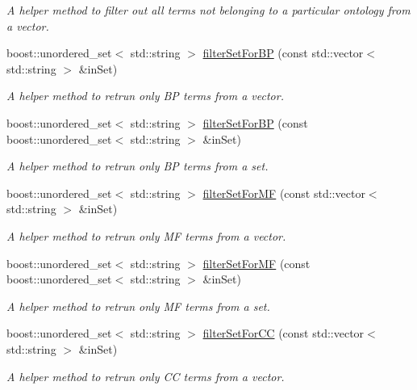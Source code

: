 \begin{DoxyCompactItemize}
\begin{DoxyCompactList}\small\item\em A helper method to filter out all terms not belonging to a particular ontology from a vector. \end{DoxyCompactList}\item 
boost\+::unordered\+\_\+set$<$ std\+::string $>$ \hyperlink{classGoGraph_a42f95a4728eac397fce20d2dcfc8a442}{filter\+Set\+For\+BP} (const std\+::vector$<$ std\+::string $>$ \&in\+Set)
\begin{DoxyCompactList}\small\item\em A helper method to retrun only BP terms from a vector. \end{DoxyCompactList}\item 
boost\+::unordered\+\_\+set$<$ std\+::string $>$ \hyperlink{classGoGraph_ac6e27dbb91d23ea04191abac4c06e401}{filter\+Set\+For\+BP} (const boost\+::unordered\+\_\+set$<$ std\+::string $>$ \&in\+Set)
\begin{DoxyCompactList}\small\item\em A helper method to retrun only BP terms from a set. \end{DoxyCompactList}\item 
boost\+::unordered\+\_\+set$<$ std\+::string $>$ \hyperlink{classGoGraph_a22cedc3faddb0ca598620f2868a46046}{filter\+Set\+For\+MF} (const std\+::vector$<$ std\+::string $>$ \&in\+Set)
\begin{DoxyCompactList}\small\item\em A helper method to retrun only MF terms from a vector. \end{DoxyCompactList}\item 
boost\+::unordered\+\_\+set$<$ std\+::string $>$ \hyperlink{classGoGraph_ac1885e77b0a5f5158e7a94b4404f8c9a}{filter\+Set\+For\+MF} (const boost\+::unordered\+\_\+set$<$ std\+::string $>$ \&in\+Set)
\begin{DoxyCompactList}\small\item\em A helper method to retrun only MF terms from a set. \end{DoxyCompactList}\item 
boost\+::unordered\+\_\+set$<$ std\+::string $>$ \hyperlink{classGoGraph_ad1756e5daeea19ec063b67c2a29594be}{filter\+Set\+For\+CC} (const std\+::vector$<$ std\+::string $>$ \&in\+Set)
\begin{DoxyCompactList}\small\item\em A helper method to retrun only CC terms from a vector. \end{DoxyCompactList}\item 

\end{DoxyCompactItemize}
